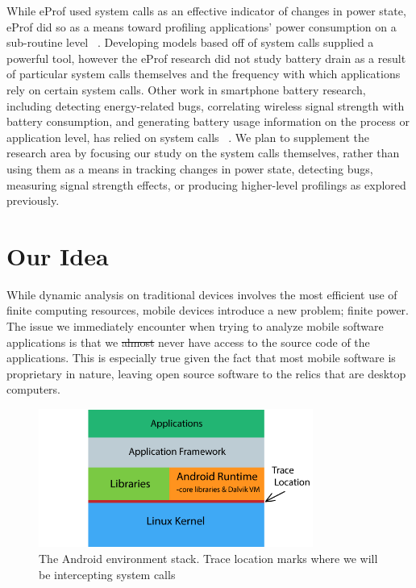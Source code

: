 \documentclass[11pt]{article}
\begin{document}
While eProf used system calls as an effective indicator of changes in power
state, eProf did so as a means toward profiling applications' power 
consumption on a sub-routine level ~\cite{pathak-systemcall,pathak-eprof}.  Developing models based off of system 
calls supplied a powerful tool, however the eProf research did not study battery drain 
as a result of  particular system calls themselves and the frequency with which 
applications rely on certain system calls.  Other work in smartphone battery 
research, including detecting energy-related bugs, correlating wireless signal strength 
with battery consumption, and generating battery usage information on the process or 
application level, has relied on system calls ~\cite{yoon-appscope,pathak-bugs,ding-signals}.  We plan to supplement the 
research area by focusing our study on the system calls themselves, rather than using 
them as a means in tracking changes in power state, detecting bugs, measuring signal 
strength effects, or producing higher-level profilings as explored previously.

\section{Our Idea}

While dynamic analysis on traditional devices involves the most efficient use of finite 
computing resources, mobile devices introduce a new problem; finite power. The issue we 
immediately encounter when trying to analyze mobile software applications is that we 
\sout{almost} never have access to the source code of the applications. This is 
especially true given the fact that most mobile software is proprietary in nature, 
leaving open source software to the relics that are desktop computers.

\begin{figure}[h]
  \centerline{
        \includegraphics[width=90mm]{images/environment_graphic.png}
  }
  \caption{The Android environment stack. Trace location marks where we will be intercepting system calls}
  
 \end{figure}
\end{document}
